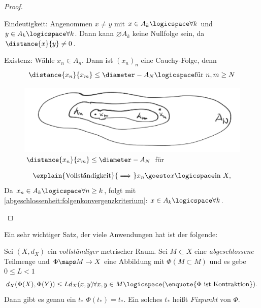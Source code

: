 \begin{proof}
    \begin{proofdescription}
        \item[Eindeutigkeit:] Angenommen \texists \( x\neq y\)  mit \( x\in A_k \logicspace \forall k\)  und \( y\in A_k \logicspace \forall k\). Dann kann \( \diameter{A_k}\) keine Nullfolge sein, da \( \distance{x}{y}\neq 0\).
        \item[Existenz:] Wähle \( x_n\in A_n\). Dann ist \( (x_n)_n\)  eine Cauchy-Folge, denn
        \begin{align*}
            \distance{x_n}{x_m}\leq \diameter-{A_N} \logicspace \text{für }n,m\geq N 
        \end{align*} 
        \begin{figure}[H]
            \centering
            \includegraphics[width=0.5\linewidth]{figures/schachtelungsprinzip}
            \caption*{\( \distance{x_n}{x_m}\leq \diameter-{A_N}\) für \( \)    }
            \label{fig:schachtelungsprinzip}
        \end{figure}
        \begin{align*}
            \explain{\text{Vollständigkeit}}{\implies}x_n \goesto x \logicspace \text{in } X,
        \end{align*}
        Da \( x_n\in A_k\logicspace \forall n\geq k\), folgt mit \ref{abgeschlossenheit:folgenkonvergenzkriterium}: \( x\in A_k\logicspace \forall k\). 
    \end{proofdescription}
\end{proof}
Ein sehr wichtiger Satz, der viele Anwendungen hat ist der folgende:
\begin{satz}
    Sei \( (X,d_X)\) ein \emph{vollständiger} metrischer Raum. Sei \( M\subset X\) eine \emph{abgeschlossene} Teilmenge und \( \Phi\maps M\to X\) eine Abbildung mit \( \Phi(M\subset M)\) und es gebe \( 0\leq L<1\) \sd
    \begin{align*}
        d_X(\Phi(X),\Phi(Y))\leq L d_X(x,y)\forall x,y\in M\logicspace (\text{\enquote{\( \Phi\) ist Kontraktion}}).
    \end{align*}
    Dann gibt es genau ein \( t_*\) \sd \( \Phi(t_*)=t_*\). Ein solches \( t_*\) heißt \emph{Fixpunkt} von \( \Phi\). 
\end{satz}
